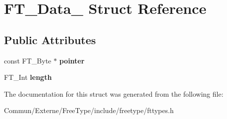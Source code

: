 \hypertarget{struct_f_t___data__}{}\section{F\+T\+\_\+\+Data\+\_\+ Struct Reference}
\label{struct_f_t___data__}
\subsection*{Public Attributes}
\begin{DoxyCompactItemize}
\item 
const F\+T\+\_\+\+Byte $\ast$ {\bfseries pointer}\hypertarget{struct_f_t___data___a4dea731b8a256b973757e1b8f612b050}{}\label{struct_f_t___data___a4dea731b8a256b973757e1b8f612b050}

\item 
F\+T\+\_\+\+Int {\bfseries length}\hypertarget{struct_f_t___data___af60c89dccd1852aceb0dc08675aca2fd}{}\label{struct_f_t___data___af60c89dccd1852aceb0dc08675aca2fd}

\end{DoxyCompactItemize}


The documentation for this struct was generated from the following file\+:\begin{DoxyCompactItemize}
\item 
Commun/\+Externe/\+Free\+Type/include/freetype/fttypes.\+h\end{DoxyCompactItemize}
